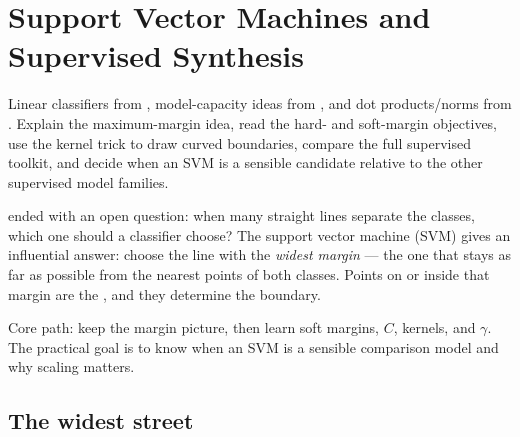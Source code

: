\chapter{Support Vector Machines and Supervised Synthesis}
\label{ch:svm}

\chapterguide%
  {Linear classifiers from , model-capacity ideas from , and dot products/norms from .}
  {Explain the maximum-margin idea, read the hard- and soft-margin objectives, use the kernel trick to draw curved boundaries, compare the full supervised toolkit, and decide when an SVM is a sensible candidate relative to the other supervised model families.}

 ended with an open question: when many straight lines separate the classes, which one should a classifier choose? The support vector machine (SVM) gives an influential answer: choose the line with the \emph{widest margin} --- the one that stays as far as possible from the nearest points of both classes. Points on or inside that margin are the , and they determine the boundary.

\begin{firstread}
Core path: keep the margin picture, then learn soft margins, $C$, kernels, and $\gamma$. The practical goal is to know when an SVM is a sensible comparison model and why scaling matters.
\end{firstread}

\section{The widest street}

\begin{mlfigure}
\end{mlfigure}

